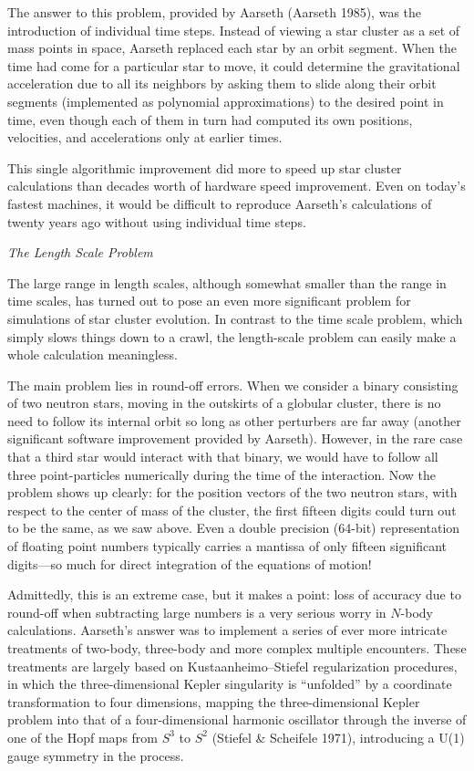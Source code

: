The answer to this problem, provided by Aarseth (\cf Aarseth 1985),
was the introduction of individual time steps.  Instead of viewing a
star cluster as a set of mass points in space, Aarseth replaced each
star by an orbit segment.  When the time had come for a particular
star to move, it could determine the gravitational acceleration due to
all its neighbors by asking them to slide along their orbit segments
(implemented as polynomial approximations) to the desired point in
time, even though each of them in turn had computed its own positions,
velocities, and accelerations only at earlier times.

This single algorithmic improvement did more to speed up star cluster
calculations than decades worth of hardware speed improvement.  Even
on today's fastest machines, it would be difficult to reproduce
Aarseth's calculations of twenty years ago without using individual
time steps.

\bigskip
\noindent
{\it The Length Scale Problem}
\medskip

The large range in length scales, although somewhat smaller than the
range in time scales, has turned out to pose an even more significant
problem for simulations of star cluster evolution.  In contrast to the
time scale problem, which simply slows things down to a crawl, the
length-scale problem can easily make a whole calculation meaningless.

The main problem lies in round-off errors.  When we consider a binary
consisting of two neutron stars, moving in the outskirts of a globular
cluster, there is no need to follow its internal orbit so long as
other perturbers are far away (another significant software
improvement provided by Aarseth).  However, in the rare case that a
third star would interact with that binary, we would have to follow
all three point-particles numerically during the time of the
interaction.  Now the problem shows up clearly: for the position
vectors of the two neutron stars, with respect to the center of mass
of the cluster, the first fifteen digits could turn out to be the
same, as we saw above.  Even a double precision (64-bit)
representation of floating point numbers typically carries a mantissa
of only fifteen significant digits---so much for direct integration of
the equations of motion!

Admittedly, this is an extreme case, but it makes a point: loss of
accuracy due to round-off when subtracting large numbers is a very
serious worry in $N$-body calculations.  Aarseth's answer was to
implement a series of ever more intricate treatments of two-body,
three-body and more complex multiple encounters.  These treatments are
largely based on Kustaanheimo--Stiefel regularization procedures, in
which the three-dimensional Kepler singularity is ``unfolded'' by a
coordinate transformation to four dimensions, mapping the
three-dimensional Kepler problem into that of a four-dimensional
harmonic oscillator through the inverse of one of the Hopf maps from
$S^3$ to $S^2$ (\cf Stiefel \& Scheifele 1971), introducing a U(1)
gauge symmetry in the process.


